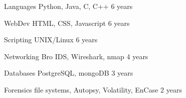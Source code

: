 

\begin{cvhonors}

  \cvhonor
    {Languages} %
    {Python, Java, C, C++} %
    {6 years}
    {}

  \cvhonor
    {WebDev} %
    {HTML, CSS, Javascript} %
    {6 years}
    {}

  

  \cvhonor
    {Scripting} %
    {UNIX/Linux} %
    {6 years}
    {}
    
      \cvhonor
    {Networking} %
    {Bro IDS, Wireshark, nmap} %
    {4 years}
    {}
    
    
    \cvhonor
    {Databases} %
    {PostgreSQL, mongoDB} %
    {3 years}
    {}
    
     \cvhonor
    {Forensics} %
    {file systems, Autopsy, Volatility, EnCase} %
    {2 years}
    {}


\end{cvhonors}